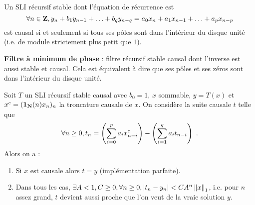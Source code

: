 \begin{pop}
	Un SLI récursif stable dont l'équation de récurrence est
	\vspace{-0.15cm}$$
	\forall n \in \Z, y_n + b_1 y_{n - 1} + \ldots + b_q y_{n - q} = a_0 x_n + a_1 x_{n - 1} + \ldots + a_p x_{n - p}
	\vspace{-0.15cm}$$
	est causal si et seulement si tous ses pôles sont dans l'intérieur du disque unité (i.e. de module strictement plus petit que $1$).
\end{pop}

\begin{defn}
	\textbf{Filtre à minimum de phase} : filtre récursif stable causal dont l'inverse est aussi stable et causal.
	Cela est équivalent à dire que ses pôles et ses zéros sont dans l'intérieur du disque unité.
\end{defn}

\begin{pop}
	Soit $T$ un SLI récursif stable causal avec $b_0 = 1$, $x$ sommable, $y = T(x)$ et $x^c = (\operatorname{\mathbf{1}}_{\mathbf{N}}(n) x_n)_n$ la troncature causale de $x$.
	On considère la suite causale $t$ telle que
	\vspace{-0.15cm}$$
	\forall n \geq 0, t_n = \left( \sum_{i = 0}^p a_i x^c_{n - i} \right) - \left( \sum_{i = 1}^q a_i t_{n - i} \right)\ .
	\vspace{-0.15cm}$$
	Alors on a :
	\begin{enumerate}
	\item Si $x$ est causale alors $t = y$ (implémentation parfaite).
	\item Dans tous les cas,
		$\exists A < 1, C \geq 0, \forall n \geq 0, \left\lvert t_n - y_n\right\rvert < C A^n \left\lVert x\right\rVert_1$,
		i.e. pour $n$ assez grand, $t$ devient aussi proche que l'on veut de la vraie solution $y$.
	\end{enumerate}
\end{pop}